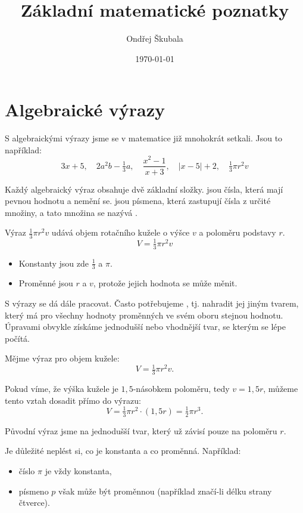 \documentclass[12pt,a4paper]{article}
\title{Základní matematické poznatky}
\author{Ondřej Škubala}
\date{\today}
\begin{document}
\maketitle
\newpage

\section{Algebraické výrazy}

S algebraickými výrazy jsme se v matematice již mnohokrát setkali.  
Jsou to například:
\[
3x + 5, \quad 2a^2b - \tfrac{1}{3}a, \quad \frac{x^2 - 1}{x+3}, \quad |x-5| + 2, \quad \tfrac{1}{3}\pi r^2 v
\]

\noindent
Každý algebraický výraz obsahuje dvě základní složky.  
 jsou čísla, která mají pevnou hodnotu a nemění se.  
 jsou písmena, která zastupují čísla z určité množiny, a tato množina se nazývá .  

\begin{examplebox}
Výraz $\tfrac{1}{3}\pi r^2 v$ udává objem rotačního kužele o výšce $v$ a poloměru podstavy $r$.  
\[
V = \tfrac{1}{3}\pi r^2 v
\]

\begin{itemize}
    \item Konstanty jsou zde $\tfrac{1}{3}$ a $\pi$.  
    \item Proměnné jsou $r$ a $v$, protože jejich hodnota se může měnit.  
\end{itemize}
\end{examplebox}

\noindent
S výrazy se dá dále pracovat. Často potřebujeme , tj. nahradit jej jiným tvarem, který má pro všechny hodnoty proměnných ve svém oboru stejnou hodnotu. Úpravami obvykle získáme jednodušší nebo vhodnější tvar, se kterým se lépe počítá.  

\begin{examplebox}
Mějme výraz pro objem kužele:
\[
V = \tfrac{1}{3}\pi r^2 v.
\]

Pokud víme, že výška kužele je $1{,}5$-násobkem poloměru, tedy $v = 1{,}5r$,  
můžeme tento vztah dosadit přímo do výrazu:  
\[
V = \tfrac{1}{3}\pi r^2 \cdot (1{,}5r) = \tfrac{1}{2}\pi r^3.
\]

Původní výraz jsme  na jednodušší tvar, který už závisí pouze na poloměru $r$.  
\end{examplebox}

\noindent
Je důležité neplést si, co je konstanta a co proměnná. Například:
\begin{itemize}
    \item číslo $\pi$ je vždy konstanta,  
    \item písmeno $p$ však může být proměnnou (například značí-li délku strany čtverce).  
\end{itemize}
\end{document}
